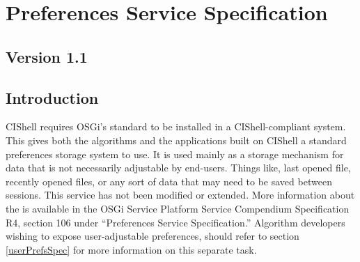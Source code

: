 \chapter{Preferences Service Specification}
\label{preferencesService}
\section*{Version 1.1}
\section{Introduction}

CIShell requires OSGi's standard  to be installed in a
CIShell-compliant system. This gives both the algorithms and the applications
built on CIShell a standard preferences storage system to use. It is used mainly
as a storage mechanism for data that is not necessarily adjustable by end-users.
Things like, last opened file, recently opened files, or any sort of data that
may need to be saved between sessions. This service has not been modified or
extended. More information about the  is available in
the OSGi Service Platform Service Compendium Specification R4, section 106 under
``Preferences Service Specification.'' Algorithm developers wishing to expose
user-adjustable preferences, should refer to section \ref{userPrefsSpec} for
more information on this separate task.
